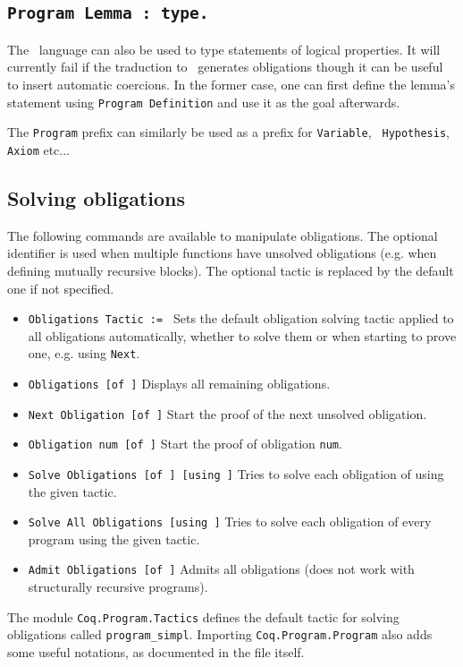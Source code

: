 \subsection{\tt Program Lemma {\ident} : type.
  \label{ProgramLemma}}

The \Russell\ language can also be used to type statements of logical
properties. It will currently fail if the traduction to \Coq\
generates obligations though it can be useful to insert automatic
coercions. In the former case, one can first define the lemma's
statement using {\tt Program Definition} and use it as the goal afterwards.

The {\tt Program} prefix can similarly be used as a prefix for {\tt Variable}, {\tt
  Hypothesis}, {\tt Axiom} etc...

\subsection{Solving obligations}
The following commands are available to manipulate obligations. The
optional identifier is used when multiple functions have unsolved
obligations (e.g. when defining mutually recursive blocks). The optional
tactic is replaced by the default one if not specified.

\begin{itemize}
\item {\tt Obligations Tactic := \tacexpr} Sets the default obligation
  solving tactic applied to all obligations automatically, whether to
  solve them or when starting to prove one, e.g. using {\tt Next}.
\item {\tt Obligations [of \ident]} Displays all remaining
  obligations.
\item {\tt Next Obligation [of \ident]} Start the proof of the next
  unsolved obligation.
\item {\tt Obligation num [of \ident]} Start the proof of
  obligation {\tt num}.
\item {\tt Solve Obligations [of \ident] [using \tacexpr]} Tries to solve
  each obligation of \ident using the given tactic.
\item {\tt Solve All Obligations [using \tacexpr]} Tries to solve
  each obligation of every program using the given tactic.
\item {\tt Admit Obligations [of \ident]} Admits all
  obligations (does not work with structurally recursive programs).
\end{itemize}

The module {\tt Coq.Program.Tactics} defines the default tactic for solving
obligations called {\tt program\_simpl}. Importing 
{\tt Coq.Program.Program} also adds some useful notations, as documented in the file itself.

